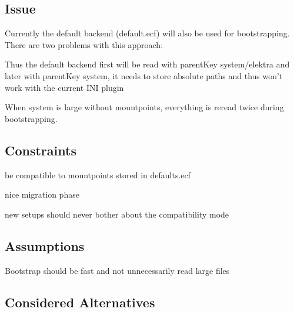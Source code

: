 \subsection*{Issue}

Currently the default backend (default.\+ecf) will also be used for bootstrapping. There are two problems with this approach\+:


\begin{DoxyEnumerate}
\item Thus the default backend first will be read with parent\+Key {\ttfamily system/elektra} and later with parent\+Key {\ttfamily system}, it needs to store absolute paths and thus won't work with the current I\+N\+I plugin
\item When {\ttfamily system} is large without mountpoints, everything is reread twice during bootstrapping.
\end{DoxyEnumerate}

\subsection*{Constraints}


\begin{DoxyItemize}
\item be compatible to mountpoints stored in {\ttfamily defaults.\+ecf}
\item nice migration phase
\item new setups should never bother about the compatibility mode
\end{DoxyItemize}

\subsection*{Assumptions}


\begin{DoxyItemize}
\item Bootstrap should be fast and not unnecessarily read large files
\end{DoxyItemize}

\subsection*{Considered Alternatives}


